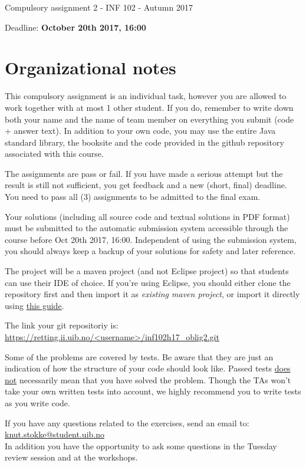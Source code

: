 \documentclass[11pt]{article}
\begin{document}
\begin{center} \huge Compulsory assignment 2 - INF 102 - Autumn 2017 \end{center}
\hfill
\begin{center} \large Deadline: \textbf{October 20th 2017, 16:00} \end{center}
\hfill

\section*{Organizational notes}
This compulsory assignment is an individual task, however you are allowed to work together with at most 1 other student. If you do, remember to write down both your name and the name of team member on everything you submit (code + answer text).
In addition to your own code, you may use the entire Java standard library, the booksite and the code provided in the github repository associated with this course.

The assignments are pass or fail. If you have made a serious attempt but the result is still not  sufficient, you get feedback and a new (short, final) deadline. You need to pass all (3) assignments to be admitted to the final exam.

Your solutions (including all source code and textual solutions in PDF format) must be submitted to the automatic submission system accessible through the course before Oct 20th 2017, 16:00. Independent of using the submission system, you should always keep a backup of your solutions for safety and later reference.

The project will be a maven project (and not Eclipse project) so that students can use their IDE of choice. If you're using Eclipse, you should either clone the repository first and then import it as \textit{existing maven project}, or import it directly using \href{https://stackoverflow.com/a/7269917/4080590}{\underline{this guide}}.

The link your git repositoriy is:
\underline{https://retting.ii.uib.no/\textless username\textgreater/inf102h17\_oblig2.git}

Some of the problems are covered by tests. Be aware that they are just an indication of how the structure of your code should look like. Passed tests \underline{does not} necessarily mean that you have solved the problem. Though the TAs won't take your own written tests into account, we highly recommend you to write tests as you write code.

If you have any questions related to the exercises, send an email to: \\
\mbox{\url{knut.stokke@student.uib.no}} \\
In addition you have the opportunity to ask some questions in the Tuesday review session and at the workshops.
\end{document}
